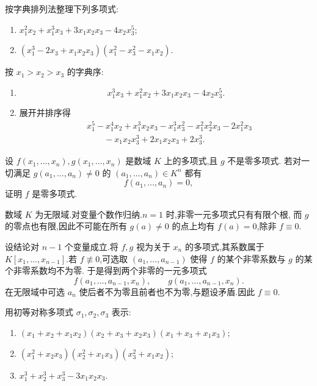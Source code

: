 \begin{example}
按字典排列法整理下列多项式:
\begin{enumerate}
  \item $x_1^2x_2+x_1^3x_3+3x_1x_2x_3-4x_2x_3^5$;
  \item $(x_1^3-2x_3+x_1x_2x_3)(x_1^2-x_3^2-x_1x_2)$.
\end{enumerate}
\end{example}
\exampleblank

\begin{solution}
按 $x_1>x_2>x_3$ 的字典序:
\begin{enumerate}
  \item
  \[
    x_1^3x_3+x_1^2x_2+3x_1x_2x_3-4x_2x_3^5.
  \]
  \item 展开并排序得
  \[
  \begin{aligned}
    {}&x_1^5-x_1^4x_2+x_1^3x_2x_3-x_1^3x_3^2
    -x_1^2x_2^2x_3-2x_1^2x_3\\
    &\qquad -x_1x_2x_3^3+2x_1x_2x_3+2x_3^3.
  \end{aligned}
  \]
\end{enumerate}
\end{solution}

\begin{example}
设 $f(x_1,\ldots,x_n),g(x_1,\ldots,x_n)$ 是数域 $K$ 上的多项式,且 $g$ 不是零多项式.
若对一切满足 $g(a_1,\ldots,a_n)\ne0$ 的 $(a_1,\ldots,a_n)\in K^n$ 都有
\[
  f(a_1,\ldots,a_n)=0,
\]
证明 $f$ 是零多项式.
\end{example}
\exampleblank

\begin{solution}
数域 $K$ 为无限域.对变量个数作归纳.$n=1$ 时,非零一元多项式只有有限个根,
而 $g$ 的零点也有限,因此不可能在所有 $g(a)\ne0$ 的点上均有 $f(a)=0$,除非 $f\equiv0$.

设结论对 $n-1$ 个变量成立.将 $f,g$ 视为关于 $x_n$ 的多项式,其系数属于
$K[x_1,\ldots,x_{n-1}]$.若 $f\not\equiv0$,可选取
$(a_1,\ldots,a_{n-1})$ 使得 $f$ 的某个非零系数与 $g$ 的某个非零系数均不为零.
于是得到两个非零的一元多项式
\[
  f(a_1,\ldots,a_{n-1},x_n),
  \qquad
  g(a_1,\ldots,a_{n-1},x_n).
\]
在无限域中可选 $a_n$ 使后者不为零且前者也不为零,与题设矛盾.因此 $f\equiv0$.
\end{solution}

\begin{example}
用初等对称多项式 $\sigma_1,\sigma_2,\sigma_3$ 表示:
\begin{enumerate}
  \item $(x_1+x_2+x_1x_2)(x_2+x_3+x_2x_3)(x_1+x_3+x_1x_3)$;
  \item $(x_1^2+x_2x_3)(x_2^2+x_1x_3)(x_3^2+x_1x_2)$;
  \item $x_1^3+x_2^3+x_3^3-3x_1x_2x_3$.
\end{enumerate}
\end{example}
\exampleblank

